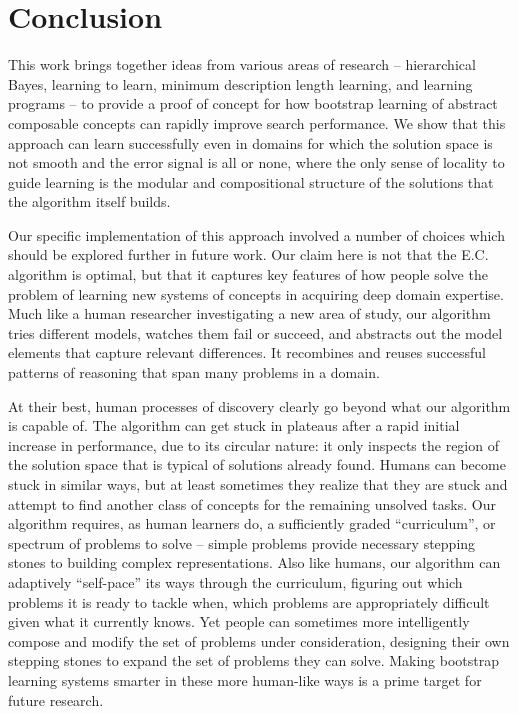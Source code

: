 \documentclass{article}
\begin{document}
\section{Conclusion}
This work brings together ideas from various areas of research --
hierarchical Bayes, learning to learn, minimum description length
learning, and learning programs -- to provide a proof of concept for
how bootstrap learning of abstract composable concepts can rapidly
improve search performance.  We show that this approach can learn
successfully even in domains for which the solution space is not
smooth and the error signal is all or none, where the only sense of
locality to guide learning is the modular and compositional structure
of the solutions that the algorithm itself builds.

Our specific implementation of this approach involved a number of
choices which should be explored further in future work.  Our claim
here is not that the E.C. algorithm is optimal, but that it captures key
features of how people solve the problem of learning new systems of
concepts in acquiring deep domain expertise.  Much like a human
researcher investigating a new area of study, our algorithm tries
different models, watches them fail or succeed, and abstracts out the
model elements that capture relevant differences.  It recombines and
reuses successful patterns of reasoning that span many problems in a
domain.

At their best, human processes of discovery clearly go beyond
what our algorithm is capable of.  The algorithm can get stuck in
plateaus after a rapid initial increase in performance, due to its
circular nature: it only inspects the region of the solution space
that is typical of solutions already found.  Humans can become stuck
in similar ways, but at least sometimes they realize that they are
stuck and attempt to find another class of concepts for the remaining
unsolved tasks.  Our algorithm requires, as human learners do, a
sufficiently graded ``curriculum'', or spectrum of problems to solve --
simple problems provide necessary stepping stones to building complex
representations.  Also like humans, our algorithm can adaptively
``self-pace'' its ways through the curriculum, figuring out which
problems it is ready to tackle when, which problems are appropriately
difficult given what it currently knows.  Yet people can sometimes
more intelligently compose and modify the set of problems under
consideration, designing their own stepping stones to expand the set
of problems they can solve.  Making bootstrap learning systems smarter
in these more human-like ways is a prime target for future research.
\end{document}
